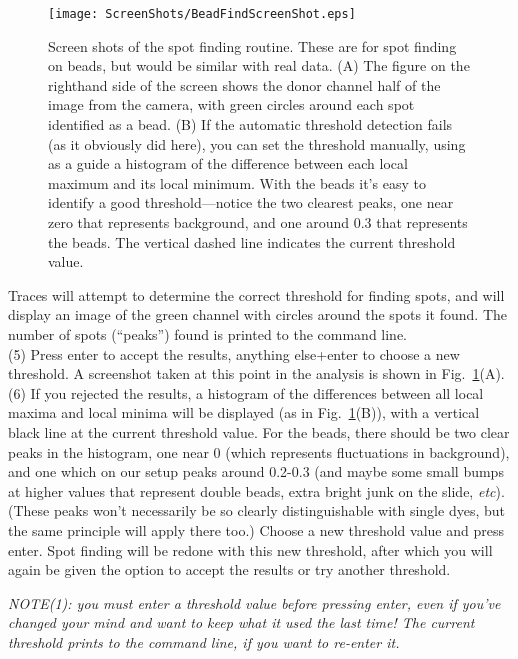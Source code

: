 \documentclass[11pt]{article}
\begin{document}
\begin{figure}
\begin{center}
\texttt{[image: ScreenShots/BeadFindScreenShot.eps]}
\caption{Screen shots of the spot finding routine. These are for spot finding on beads, but would be similar with real data. (A) The figure on the righthand side of the screen shows the donor channel half of the image from the camera, with green circles around each spot identified as a bead. (B) If the automatic threshold detection fails (as it obviously did here), you can set the threshold manually, using as a guide a histogram of the difference between each local maximum and its local minimum.  With the beads it's easy to identify a good threshold---notice the two clearest peaks, one near zero that represents background, and one around 0.3 that represents the beads. The vertical dashed line indicates the current threshold value. }
\label{fig:BeadFindShot}
\end{center}
\end{figure}

Traces will attempt to determine the correct threshold for finding spots, and will display an image of the green channel with circles around the spots it found. The number of spots (``peaks'') found is printed to the command line. \\

\noindent (5) Press enter to accept the results, anything else+enter to choose a new threshold.  A screenshot taken at this point in the analysis is shown in Fig.~\ref{fig:BeadFindShot}(A).\\

\noindent (6) If you rejected the results, a histogram of the differences between all local maxima and local minima will be displayed (as in Fig.~\ref{fig:BeadFindShot}(B)), with a vertical black line at the current threshold value.  For the beads, there should be two clear peaks in the histogram, one near 0 (which represents fluctuations in background), and one which on our setup peaks around 0.2-0.3 (and maybe some small bumps at higher values that represent double beads, extra bright junk on the slide, {\it etc}). (These peaks won't necessarily be so clearly distinguishable with single dyes, but the same principle will apply there too.) Choose a new threshold value and press enter.  Spot finding will be redone with this new threshold, after which you will again be given the option to accept the results or try another threshold.

{\it NOTE(1): you must enter a threshold value before pressing enter, even if you've changed your mind and want to keep what it used the last time!  The current threshold prints to the command line, if you want to re-enter it.}
\end{document}
